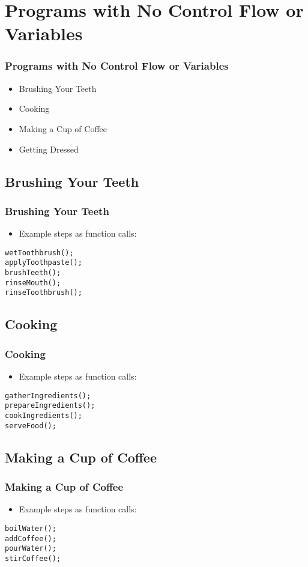\section{Programs with No Control Flow or Variables}
\begin{frame}
\frametitle{Programs with No Control Flow or Variables}
\begin{itemize}
    \item Brushing Your Teeth
    \item Cooking
    \item Making a Cup of Coffee
    \item Getting Dressed
\end{itemize}
\end{frame}

\subsection{Brushing Your Teeth}
\begin{frame}[fragile]
\frametitle{Brushing Your Teeth}
\begin{itemize}
    \item Example steps as function calls:
\end{itemize}
\begin{lstlisting}
wetToothbrush();
applyToothpaste();
brushTeeth();
rinseMouth();
rinseToothbrush();
\end{lstlisting}
\end{frame}

\subsection{Cooking}
\begin{frame}[fragile]
\frametitle{Cooking}
\begin{itemize}
    \item Example steps as function calls:
\end{itemize}
\begin{lstlisting}
gatherIngredients();
prepareIngredients();
cookIngredients();
serveFood();
\end{lstlisting}
\end{frame}

\subsection{Making a Cup of Coffee}
\begin{frame}[fragile]
\frametitle{Making a Cup of Coffee}
\begin{itemize}
    \item Example steps as function calls:
\end{itemize}
\begin{lstlisting}
boilWater();
addCoffee();
pourWater();
stirCoffee();
\end{lstlisting}
\end{frame}

